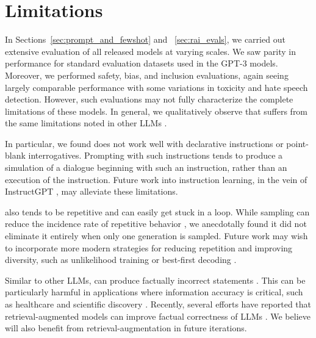 \section{Limitations}
\label{sec:limitations}

In Sections~\ref{sec:prompt_and_fewshot} and ~\ref{sec:rai_evals}, we carried out extensive evaluation of all released models at varying scales. We saw parity in performance for standard evaluation datasets used in the GPT-3 models. 
Moreover, we performed safety, bias, and inclusion evaluations, again seeing largely comparable performance with some variations in toxicity and hate speech detection. 
However, such evaluations may not fully characterize the complete limitations of these models. In general, we qualitatively observe that \OPT{} suffers from the same limitations noted in other LLMs \cite{brown2020gpt3,J1WhitePaper,thoppilan2022lamda,gopher2022,megatron2022,palm2022,bender2021dangers}.

In particular, we found \OPT{} does not work well with declarative instructions or point-blank interrogatives. Prompting with such instructions tends to produce a simulation of a dialogue beginning with such an instruction, rather than an execution of the instruction. Future work into instruction learning, in the vein of InstructGPT \cite{ouyang2022training}, may alleviate these limitations.

\OPT{} also tends to be repetitive and can easily get stuck in a loop. While sampling can reduce the incidence rate of repetitive behavior \cite{holtzman2020nucleus}, we anecdotally found it did not eliminate it entirely when only one generation is sampled. Future work may wish to incorporate more modern strategies for reducing repetition and improving diversity, such as unlikelihood training \cite{welleck2019neuraltext} or best-first decoding \cite{meister-etal-2020-best}.

Similar to other LLMs, \OPT{} can produce factually incorrect statements \cite{adiwardana2020meena,brown2020gpt3, roller-etal-2021-recipes,gopher2022,palm2022,thoppilan2022lamda}. This can be particularly harmful in applications where information accuracy is critical, such as healthcare and scientific discovery \cite{weidinger2021ethical}. Recently, several efforts have reported that retrieval-augmented models can improve factual correctness of LLMs \cite{lewis2020retrieval,komeili2021woi,thoppilan2022lamda,borgeaud2021improving,shuster2022language,nakano2021webgpt}. We believe \OPT{} will also benefit from retrieval-augmentation in future iterations.

